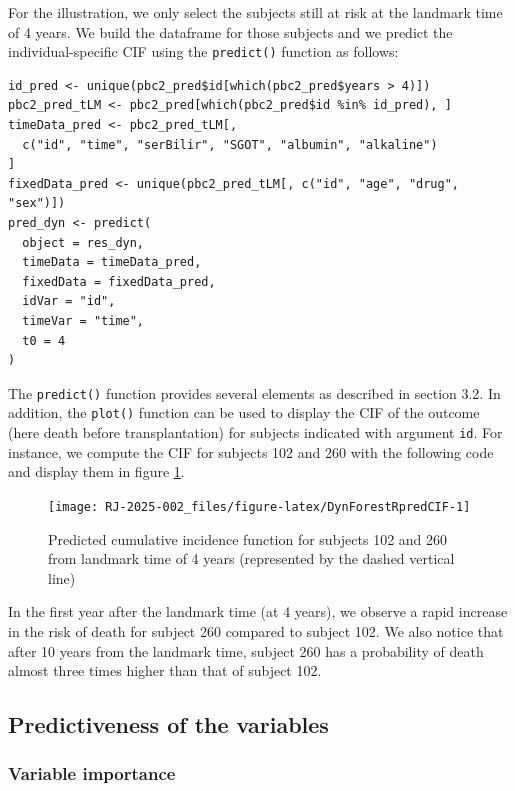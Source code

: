 For the illustration, we only select the subjects still at risk at the landmark time of 4 years. We build the dataframe for those subjects and we predict the individual-specific CIF using the \texttt{predict()} function as follows:

\begin{verbatim}
id_pred <- unique(pbc2_pred$id[which(pbc2_pred$years > 4)])
pbc2_pred_tLM <- pbc2_pred[which(pbc2_pred$id %in% id_pred), ]
timeData_pred <- pbc2_pred_tLM[,
  c("id", "time", "serBilir", "SGOT", "albumin", "alkaline")
]
fixedData_pred <- unique(pbc2_pred_tLM[, c("id", "age", "drug", "sex")])
pred_dyn <- predict(
  object = res_dyn,
  timeData = timeData_pred,
  fixedData = fixedData_pred,
  idVar = "id",
  timeVar = "time",
  t0 = 4
)
\end{verbatim}

The \texttt{predict()} function provides several elements as described in section 3.2. In addition, the \texttt{plot()} function can be used to display the CIF of the outcome (here death before transplantation) for subjects indicated with argument \texttt{id}. For instance, we compute the CIF for subjects 102 and 260 with the following code and display them in figure \ref{fig:DynForestRpredCIF}.

\begin{figure}

{\centering \texttt{[image: RJ-2025-002\_files/figure-latex/DynForestRpredCIF-1]} 

}

\caption{Predicted cumulative incidence function for subjects 102 and 260 from landmark time of 4 years (represented by the dashed vertical line)}\label{fig:DynForestRpredCIF}
\end{figure}

In the first year after the landmark time (at 4 years), we observe a rapid increase in the risk of death for subject 260 compared to subject 102. We also notice that after 10 years from the landmark time, subject 260 has a probability of death almost three times higher than that of subject 102.

\subsection{Predictiveness of the variables}\label{predictiveness-of-the-variables}

\subsubsection{Variable importance}\label{variable-importance-1}

